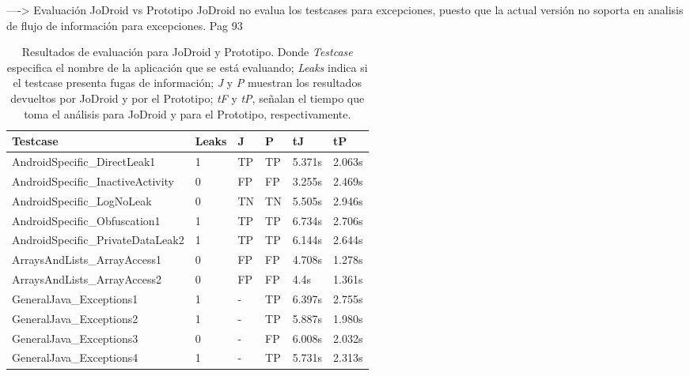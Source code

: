----> Evaluación JoDroid vs Prototipo\newline
JoDroid no evalua los testcases para excepciones, puesto que la actual versión
no soporta en analisis de flujo de información para excepciones. \cite{JoDroid-Thesis} Pag 93


\begin{table}[H]
\begin{center}
\small\addtolength{\tabcolsep}{-3pt}
\caption{Resultados de evaluación para JoDroid y Prototipo. Donde
\textit{Testcase} especifica el nombre de la aplicación que se está evaluando;
\textit{Leaks} indica si el testcase presenta fugas de información; \textit{J} y
\textit{P} muestran los resultados devueltos por JoDroid y por el Prototipo;
\textit{tF} y \textit{tP}, señalan el tiempo que toma el análisis para JoDroid
y para el Prototipo, respectivamente.}
\label{tb:resultados}
\begin{tabular}{|p{6cm}|p{1cm}|p{1cm}|p{1cm}|p{1cm}|p{1cm}|}
	\hline
	\textbf{Testcase} & \textbf{Leaks} & \textbf{J} &
	\textbf{P} & \textbf{ tJ} & 
	\textbf{tP}\\
	\hline
	AndroidSpecific\_DirectLeak1 & 1 & TP & TP &5.371s &2.063s\\
	\hline
	AndroidSpecific\_InactiveActivity & 0 & FP & FP  &3.255s &2.469s\\
	\hline
	AndroidSpecific\_LogNoLeak & 0 & TN & TN &5.505s &2.946s\\
	\hline
	AndroidSpecific\_Obfuscation1 & 1 & TP & TP &6.734s &2.706s\\
	\hline
	 AndroidSpecific\_PrivateDataLeak2 & 1 & TP & TP & 6.144s &2.644s\\
	\hline
	 ArraysAndLists\_ArrayAccess1 & 0 & FP & FP & 4.708s & 1.278s\\
	\hline
	 ArraysAndLists\_ArrayAccess2 & 0 & FP & FP & 4.4s &1.361s\\
	 \hline
	 GeneralJava\_Exceptions1 & 1 & - & TP &6.397s &2.755s\\
	\hline
	 GeneralJava\_Exceptions2 & 1 & - & TP &5.887s &1.980s\\
	\hline
	GeneralJava\_Exceptions3 & 0 &  - & FP &6.008s &2.032s\\
	\hline
	GeneralJava\_Exceptions4 & 1 & - & TP &5.731s &2.313s\\

\end{tabular}
\end{center}
\end{table}
